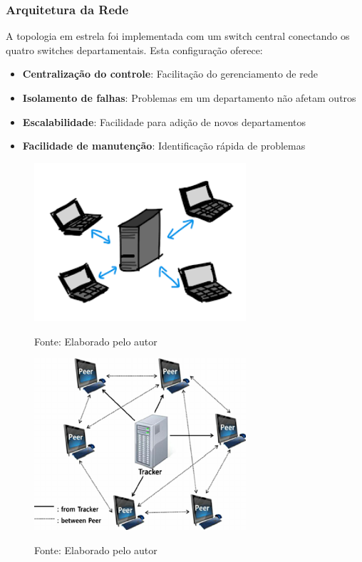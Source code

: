 \subsubsection{Arquitetura da Rede}

A topologia em estrela foi implementada com um switch central conectando os quatro switches departamentais. Esta configuração oferece:

\begin{itemize}
    \item \textbf{Centralização do controle}: Facilitação do gerenciamento de rede
    \item \textbf{Isolamento de falhas}: Problemas em um departamento não afetam outros
    \item \textbf{Escalabilidade}: Facilidade para adição de novos departamentos
    \item \textbf{Facilidade de manutenção}: Identificação rápida de problemas
\end{itemize}

\begin{figure}[H]
\centering
{}
\includegraphics[width=0.7\textwidth]{figure/cliente-server.png}

\label{fig:cliente_servidor}
{\fontsize{10pt}{\baselineskip}\selectfont
Fonte: Elaborado pelo autor}
\end{figure}

\begin{figure}[H]
\centering
{}
\includegraphics[width=0.7\textwidth]{figure/peer-to-peer.png}

\label{fig:peer_to_peer}
{\fontsize{10pt}{\baselineskip}\selectfont
Fonte: Elaborado pelo autor}
\end{figure}

